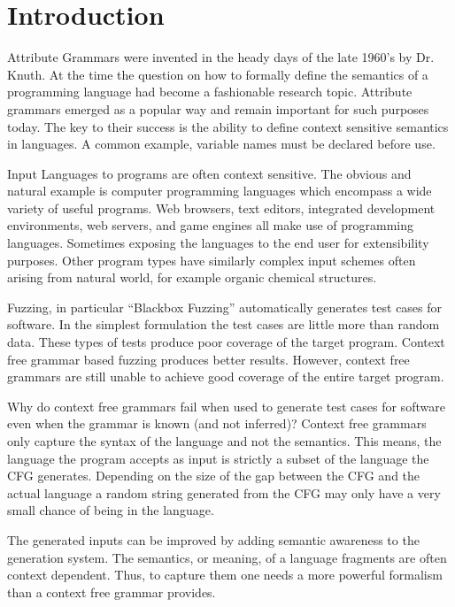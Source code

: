 
\section{Introduction}

Attribute Grammars were invented in the heady days of the late 1960's by Dr.
Knuth.\cite{Knuth1990} At the time the question on how to formally define the
semantics of a programming language had become a fashionable research topic.
Attribute grammars emerged as a popular way and remain important for such
purposes today. The key to their success is the ability to define context
sensitive semantics in languages. A common example, variable names must be
declared before use.

Input Languages to programs are often context sensitive. The obvious and natural
example is computer programming languages which encompass a wide variety of
useful programs. Web browsers, text editors, integrated development
environments, web servers, and game engines all make use of programming
languages. Sometimes exposing the languages to the end user for extensibility
purposes. Other program types have similarly complex input schemes often arising
from natural world, for example organic chemical structures.

Fuzzing, in particular ``Blackbox Fuzzing'' automatically generates test cases
for software. In the simplest formulation the test cases are little more than
random data. These types of tests produce poor coverage of the target program.
Context free grammar based fuzzing produces better results. However, context
free grammars are still unable to achieve good coverage of the entire target
program. 

Why do context free grammars fail when used to generate test cases for software
even when the grammar is known (and not inferred)? Context free grammars only
capture the syntax of the language and not the semantics. This means, the
language the program accepts as input is strictly a subset of the language the
CFG generates. Depending on the size of the gap between the CFG and the actual
language a random string generated from the CFG may only have a very small
chance of being in the language.

The generated inputs can be improved by adding semantic awareness to the
generation system. The semantics, or meaning, of a language fragments are often
context dependent. Thus, to capture them one needs a more powerful formalism than
a context free grammar provides. 

